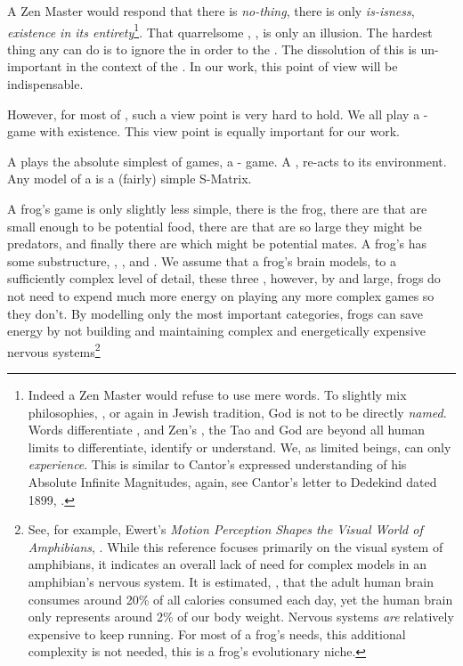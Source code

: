 A Zen Master would respond that there is \emph{no-thing}, there is only 
\emph{is-isness}, \emph{existence in its entirety}\footnote{Indeed a Zen 
Master would refuse to use mere words. To slightly mix philosophies, 
, or again in Jewish 
tradition, God is not to be directly \emph{named}. Words differentiate 
, and Zen's , the Tao and God 
are beyond all human limits to differentiate, identify or understand. We, 
as limited beings, can only \emph{experience}. This is similar to Cantor's 
expressed understanding of his Absolute Infinite Magnitudes, again, see 
Cantor's letter to Dedekind dated 1899, 
\cite{vanHeijenoort1967fregeToGodel}.}. That quarrelsome , 
\emph{}, is only an illusion. The hardest thing any  
can do is to ignore the \emph{} in order to  the 
\emph{}. The dissolution of this \emph{} is 
un-important in the context of the \emph{}. In our work, this 
point of view will be indispensable. 

However, for most of , such a view point is very hard to hold. 
We all play a - game with existence. This 
view point is equally important for our work.

A  plays the absolute simplest of games, a 
- game. A , re-acts to 
its environment. Any model of a  is a (fairly) simple 
S-Matrix. 

A frog's game is only slightly less simple, there is the frog, there are 
 that are small enough to be potential food, there are 
 that are so large they might be predators, and finally 
there are  which might be potential mates. A frog's 
 has some substructure, , 
, and . We assume that a frog's brain 
models, to a sufficiently complex level of detail, these three 
, however, by and large, frogs do not need to expend much 
more energy on playing any more complex games so they don't. By modelling 
only the most important categories, frogs can save energy by not building 
and maintaining complex and energetically expensive nervous 
systems\footnote{See, for example, Ewert's \emph{Motion Perception Shapes 
the Visual World of Amphibians}, 
\cite{ewert2004motionPerceptionAmphibians}. While this reference focuses 
primarily on the visual system of amphibians, it indicates an overall lack 
of need for complex models in an amphibian's nervous system. It is 
estimated, \cite{raichleGusnard2002brainEnergyBudget}, that the adult 
human brain consumes around 20\% of all calories consumed each day, yet 
the human brain only represents around 2\% of our body weight. Nervous 
systems \emph{are} relatively expensive to keep running. For most of a 
frog's needs, this additional complexity is not needed, this is a frog's 
evolutionary niche.} 

